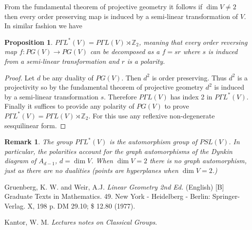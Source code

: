 \documentclass[12pt]{article}
\newtheorem{prop}[thm]{Proposition}
\newtheorem{remark}[thm]{Remark}
\begin{document}
From the fundamental theorem of projective geometry it follows if $\dim V\neq 2$ then every order preserving map is induced by a semi-linear transformation of $V$.  In similar fashion we have

\begin{prop}
$P\Gamma L^*(V)=P\Gamma L(V)\rtimes \mathbb{Z}_2$, meaning that every order
reversing map $f:PG(V)\rightarrow PG(V)$ can be decomposed as a $f=sr$ where
$s$ is induced from a semi-linear transformation and $r$ is a polarity.
\end{prop}
\begin{proof}
Let $d$ be any duality of $PG(V)$.  Then $d^2$ is order preserving.  Thus
$d^2$ is a projectivity so by the fundamental theorem of projective geometry
$d^2$ is induced by a semi-linear transformation $s$.  Therefore
$P\Gamma L(V)$ has index 2 in $P\Gamma L^*(V)$.  Finally it suffices to 
provide any polarity of $PG(V)$ to prove $P\Gamma L^*(V)=P\Gamma L(V)\rtimes \mathbb{Z}_2$.
For this use any reflexive non-degenerate sesquilinear form.
\end{proof}

\begin{remark}
The group $P\Gamma L^*(V)$ is the automorphism group of $PSL(V)$.
In particular, the polarities account for the graph automorphisms of the 
Dynkin diagram of $A_{d-1}$, $d=\dim V$.  When $\dim V=2$ there is no
graph automorphism, just as there are no dualities (points are hyperplanes 
when $\dim V=2$.)
\end{remark}



\providecommand{\bysame}{\leavevmode\hbox to3em{\hrulefill}\thinspace}
\providecommand{\MR}{\relax\ifhmode\unskip\space\fi MR }
\providecommand{\MRhref}[2]{%
\href{http://www.ams.org/mathscinet-getitem?mr=#1}{#2}
}
\providecommand{\href}[2]{#2}
\begin{thebibliography}{10}


Gruenberg, K. W. and Weir, A.J.
\emph{Linear Geometry 2nd Ed.} (English)
[B] Graduate Texts in Mathematics. 49. New York - Heidelberg - Berlin: Springer-Verlag. X, 198 p. DM 29.10; \$ 12.80 (1977).

Kantor, W. M.
\emph{Lectures notes on Classical Groups}.

\end{thebibliography}

\end{document}
